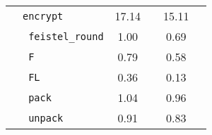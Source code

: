 \begin{table}[h!]
\begin{tabular}{llcccc}
                                                & \texttt{encrypt} & 17.14 & & 15.11 & \\
        \cmidrule(lr){2-2}
                                                & \texttt{ feistel\_round} & 1.00 & & 0.69 & \\
                                                & \texttt{ F} & 0.79 & & 0.58 & \\
                                                & \texttt{ FL} & 0.36 & & 0.13 & \\
                                                & \texttt{ pack} & 1.04 & & 0.96 & \\
                                                & \texttt{ unpack} & 0.91 & & 0.83 & \\
        \bottomrule
    \end{tabular}
\end{table}
